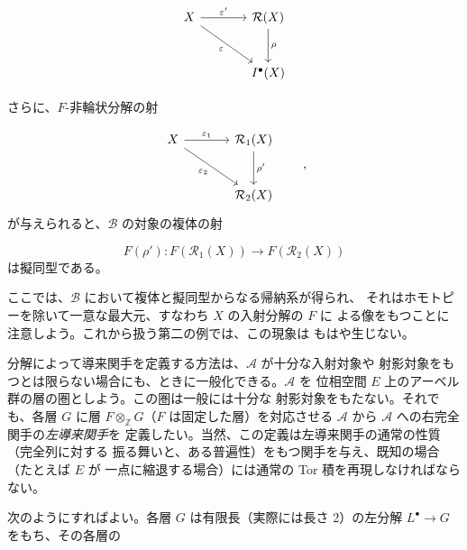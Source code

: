 \clearpage
{}

\[
\begin{tikzcd}[column sep=large,row sep=large]
X \arrow[r,"\varepsilon'"] \arrow[dr,"\varepsilon"']
  & \mathcal R(X) \arrow[d,"\rho"] \\
  & I^{\bullet}(X)
\end{tikzcd}
\]

さらに、$F$-非輪状分解の射

\[
\begin{tikzcd}[column sep=large,row sep=large]
X \arrow[r,"\varepsilon_1"] \arrow[dr,"\varepsilon_2"']
  & \mathcal R_1(X) \arrow[d,"\rho'"] \\
  & \mathcal R_2(X)
\end{tikzcd}
\qquad\text{,}
\]
が与えられると、$\mathcal B$ の対象の複体の射

\[
F(\rho') : F(\mathcal R_1(X)) \longrightarrow F(\mathcal R_2(X))
\]
は擬同型である。

ここでは、$\mathcal B$ において複体と擬同型からなる帰納系が得られ、
それはホモトピーを除いて一意な最大元、すなわち $X$ の入射分解の $F$ に
よる像をもつことに注意しよう。これから扱う第二の例では、この現象は
もはや生じない。

分解によって導来関手を定義する方法は、$\mathcal A$ が十分な入射対象や
射影対象をもつとは限らない場合にも、ときに一般化できる。$\mathcal A$ を
位相空間 $E$ 上のアーベル群の層の圏としよう。この圏は一般には十分な
射影対象をもたない。それでも、各層 $G$ に層
$F\otimes_{\mathbb Z}G$（$F$ は固定した層）を対応させる
$\mathcal A$ から $\mathcal A$ への右完全関手の\emph{左導来関手}を
定義したい。当然、この定義は左導来関手の通常の性質（完全列に対する
振る舞いと、ある普遍性）をもつ関手を与え、既知の場合（たとえば $E$ が
一点に縮退する場合）には通常の Tor 積を再現しなければならない。

次のようにすればよい。各層 $G$ は有限長（実際には長さ 2）の左分解
$L^{\bullet}\to G$ をもち、その各層の

